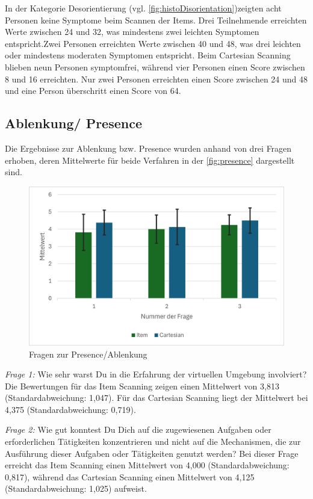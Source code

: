 In der Kategorie Desorientierung (vgl. \autoref{fig:histoDisorientation})zeigten acht Personen keine Symptome beim Scannen der Items. Drei Teilnehmende erreichten Werte zwischen 24 und 32, was mindestens zwei leichten Symptomen entspricht.Zwei Personen erreichten Werte zwischen 40 und 48, was drei leichten oder mindestens moderaten Symptomen entspricht. Beim Cartesian Scanning blieben neun Personen symptomfrei, während vier Personen einen Score zwischen 8 und 16 erreichten. Nur zwei Personen erreichten einen Score zwischen 24 und 48 und eine Person überschritt einen Score von 64. 

\subsection{Ablenkung/ Presence}

Die Ergebnisse zur Ablenkung bzw. Presence wurden anhand von drei Fragen erhoben, deren Mittelwerte für beide Verfahren in der \autoref{fig:presence} dargestellt sind.

\begin{figure}[tbh]
    \centering
    \includegraphics{images/Results/Fragen-zur-Presence-Ablenkung.png}
    \caption{Fragen zur Presence/Ablenkung}
    \label{fig:presence}
\end{figure}

\textit{Frage 1:} Wie sehr warst Du in die Erfahrung der virtuellen Umgebung involviert?
Die Bewertungen für das Item Scanning zeigen einen Mittelwert von 3,813 (Standardabweichung: 1,047). Für das Cartesian Scanning liegt der Mittelwert bei 4,375 (Standardabweichung: 0,719).

\textit{Frage 2:} Wie gut konntest Du Dich auf die zugewiesenen Aufgaben oder erforderlichen Tätigkeiten konzentrieren und nicht auf die Mechanismen, die zur Ausführung dieser Aufgaben oder Tätigkeiten genutzt werden?
Bei dieser Frage erreicht das Item Scanning einen Mittelwert von 4,000 (Standardabweichung: 0,817), während das Cartesian Scanning einen Mittelwert von 4,125 (Standardabweichung: 1,025) aufweist.

